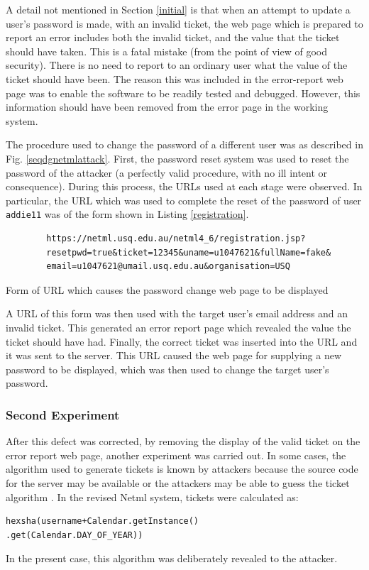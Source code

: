 \iffalse
A detail not mentioned in Section \ref{initial} is that when an attempt
to update a user's password is made, with an invalid ticket, the web 
page which is prepared to report an error includes both the invalid
ticket, and the value that the ticket should have taken. This is a fatal
mistake (from the point of view of good security). There is no need
to report to an ordinary user what the value of the ticket should
have been. The reason this was included in the error-report web page
was to enable the software to be readily tested and debugged. However,
this information should have been removed from the error page
in the working system.

The procedure used to change the password of a different user was as
described in Fig. \ref{seqdgnetmlattack}. First, the password reset system was used to reset the password
of the attacker (a perfectly valid procedure, with no ill intent or 
consequence). During this process, the URLs used at each stage
were observed. In particular, the URL which was used to complete
the reset of the password of user \verb|addie11| was of the form
shown in Listing \ref{registration}.
\begin{listing}{\scriptsize
		\begin{verbatim}
		https://netml.usq.edu.au/netml4_6/registration.jsp?
		resetpwd=true&ticket=12345&uname=u1047621&fullName=fake&
		email=u1047621@umail.usq.edu.au&organisation=USQ
		\end{verbatim}
	}
	\caption{Form of URL which causes the password change web page to be displayed}
	\label{registration}
\end{listing}
A URL of this form was then used with the target user's email address and 
an invalid ticket. This generated an error report page which revealed
the value the ticket should have had. Finally, the correct ticket was
inserted into the URL and it was sent to the server. This URL caused
the web page for supplying a new password to be displayed, which was then
used to change the target user's password.
\subsubsection{Second Experiment}
After this defect was corrected, by removing the display of the valid ticket on the error report web page,  another experiment was carried out. In some cases, the algorithm used to generate tickets is known by attackers because the source code for the server may be available or the attackers may be able to guess the ticket algorithm \cite{wang2018end}. In the revised Netml system, tickets were calculated as:
\begin{verbatim}
hexsha(username+Calendar.getInstance()
.get(Calendar.DAY_OF_YEAR))
\end{verbatim}
In the present case, this algorithm was deliberately revealed to the attacker.

